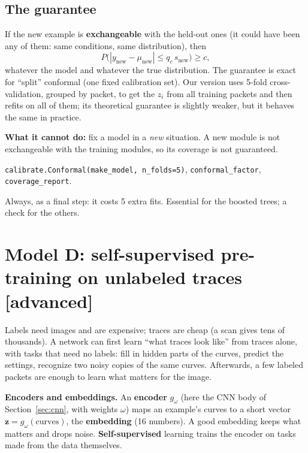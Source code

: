 \documentclass[11pt]{article}
\newcommand{\code}[1]{\texttt{#1}}
\newcommand{\level}[1]{\hfill{\normalfont\small\color{black!60}[#1]}}
\begin{document}
\subsection{The guarantee}
If the new example is \textbf{exchangeable} with the held-out ones (it could have been any of them: same conditions, same
distribution), then
\begin{equation}
P\bigl(|y_\text{new} - \mu_\text{new}| \leq q_c\,s_\text{new}\bigr) \geq c ,
\end{equation}
whatever the model and whatever the true distribution. The guarantee is exact for ``split'' conformal (one fixed calibration set).
Our version uses 5-fold cross-validation, grouped by packet, to get the $z_i$ from all training packets and then refits on all of
them; its theoretical guarantee is slightly weaker, but it behaves the same in practice.

\textbf{What it cannot do:} fix a model in a \emph{new} situation. A new module is not exchangeable with the training modules, so
its coverage is not guaranteed.

\begin{ours}
\code{calibrate.Conformal(make\_model, n\_folds=5)}, \code{conformal\_factor}, \code{coverage\_report}.
\end{ours}

\begin{when}
Always, as a final step: it costs 5 extra fits. Essential for the boosted trees; a check for the others.
\end{when}

\section{Model D: self-supervised pre-training on unlabeled traces \level{advanced}}
\label{sec:pretrain}

\begin{idea}
Labels need images and are expensive; traces are cheap (a scan gives tens of thousands). A network can first learn ``what traces
look like'' from traces alone, with tasks that need no labels: fill in hidden parts of the curves, predict the settings, recognize
two noisy copies of the same curves. Afterwards, a few labeled packets are enough to learn what matters for the image.
\end{idea}

\begin{background}
\textbf{Encoders and embeddings.} An \textbf{encoder} $g_\omega$ (here the CNN body of Section~\ref{sec:cnn}, with weights $\omega$)
maps an example's curves to a short vector $\bm z = g_\omega(\text{curves})$, the \textbf{embedding} (16 numbers). A good
embedding keeps what matters and drops noise. \textbf{Self-supervised} learning trains the encoder on tasks made from the data
themselves.
\end{background}
\end{document}

